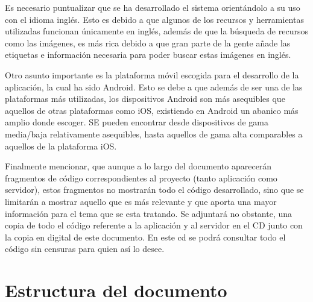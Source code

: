 Es necesario puntualizar que se ha desarrollado el sistema orientándolo a su uso con el idioma inglés. Esto es debido a que algunos de los recursos y herramientas utilizadas funcionan únicamente en inglés, además de que la búsqueda de recursos como las imágenes, es más rica debido a que gran parte de la gente añade las etiquetas e información necesaria para poder buscar estas imágenes en inglés.

Otro asunto importante es la plataforma móvil escogida para el desarrollo de la aplicación, la cual ha sido Android. Esto se debe a que además de ser una de las plataformas más utilizadas, los dispositivos Android son más asequibles que aquellos de otras plataformas como iOS, existiendo en Android un abanico más amplio donde escoger. SE pueden encontrar desde dispositivos de gama media/baja relativamente asequibles, hasta aquellos de gama alta comparables a aquellos de la plataforma iOS.

Finalmente mencionar, que aunque a lo largo del documento aparecerán fragmentos de código correspondientes al proyecto (tanto aplicación como servidor), estos fragmentos no mostrarán todo el código desarrollado, sino que se limitarán a mostrar aquello que es más relevante y que aporta una mayor información para el tema que se esta tratando. Se adjuntará no obstante, una copia de todo el código referente a la aplicación y al servidor en el CD junto con la copia en digital de este documento. En este cd se podrá consultar todo el código sin censuras para quien así lo desee.


\section{Estructura del documento}

